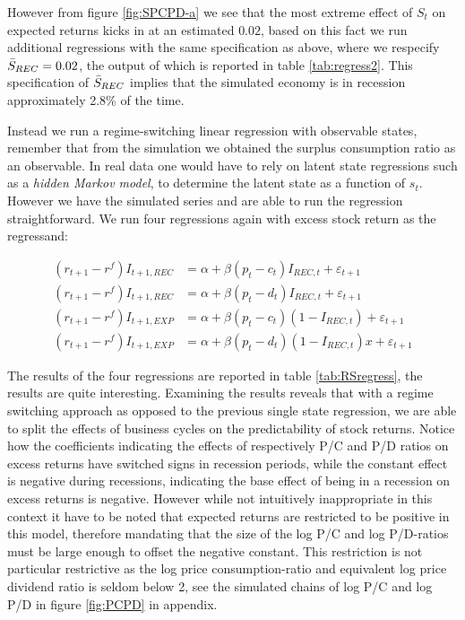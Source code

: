 However from figure \ref{fig:SPCPD-a} we see that the most extreme effect of $S_t$ on expected returns kicks in at an estimated $0.02$, based on this fact we run additional regressions with the same specification as above, where we respecify $\Bar{S}_{REC}=0.02$, the output of which is reported in table \ref{tab:regress2}. This specification of $\Bar{S}_{REC}$ implies that the simulated economy is in recession approximately 2.8\% of the time.







Instead we run a regime-switching linear regression with observable states, remember that from the simulation we obtained the surplus consumption ratio as an observable. In real data one would have to rely on latent state regressions such as a \textit{hidden Markov model}, to determine the latent state as a function of $s_t$.\\
However we have the simulated series and are able to run the regression straightforward. We run four regressions again with excess stock return as the regressand:

\begin{align*}
    \left(r_{t+1} - r^{f}\right) I_{t+1,REC} &=  \alpha + \beta \left( p_t - c_t \right) I_{REC,t} + \varepsilon_{t+1}\\
    \left(r_{t+1} - r^{f}\right)I_{t+1,REC} &=  \alpha + \beta \left( p_t - d_t \right) I_{REC,t} + \varepsilon_{t+1}\\
    \left(r_{t+1} - r^{f}\right)I_{t+1,EXP} &=  \alpha + \beta \left( p_t - c_t \right) \left( 1- I_{REC,t}\right)  + \varepsilon_{t+1}\\
    \left(r_{t+1} - r^{f}\right)I_{t+1,EXP} &=  \alpha + \beta \left( p_t - d_t \right) \left( 1- I_{REC,t}\right) x+ \varepsilon_{t+1}
\end{align*}

The results of the four regressions are reported in table \ref{tab:RSregress}, the results are quite interesting. Examining the results reveals that with a regime switching approach as opposed to the previous single state regression, we are able to split the effects of business cycles on the predictability of stock returns. Notice how the coefficients indicating the effects of respectively P/C and P/D ratios on excess returns have switched signs in recession periods, while the constant effect is negative during recessions, indicating the base effect of being in a recession on excess returns is negative. However while not intuitively inappropriate in this context it have to be noted that expected returns are restricted to be positive in this model, therefore mandating that the size of the log P/C and log P/D-ratios must be large enough to offset the negative constant. This restriction is not particular restrictive as the log price consumption-ratio and equivalent log price dividend ratio is seldom below 2, see the simulated chains of log P/C and log P/D in figure \ref{fig:PCPD} in appendix.\\

